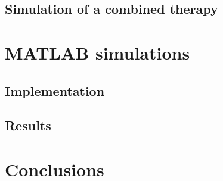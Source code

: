 \documentclass[fleqn,10pt]{SelfArx} %
\begin{document}
\subsection{Simulation of a combined therapy}



\section{MATLAB simulations}
\subsection{Implementation}


\subsection{Results}


\section{Conclusions} %


\printbibliography
%
%

\end{document}
